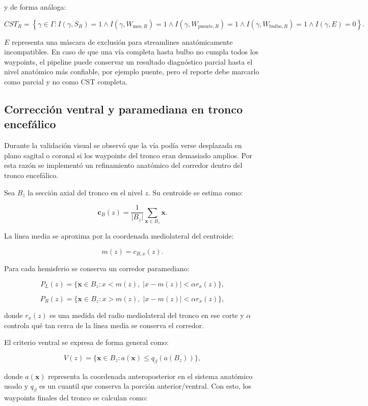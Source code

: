 \documentclass[12pt,a4paper]{article}
\begin{document}
y de forma análoga:

\[
CST_R=
\left\{
\gamma\in\Gamma:
I(\gamma,S_R)=1
\land
I(\gamma,W_{\text{mes},R})=1
\land
I(\gamma,W_{\text{puente},R})=1
\land
I(\gamma,W_{\text{bulbo},R})=1
\land
I(\gamma,E)=0
\right\}.
\]

$E$ representa una máscara de exclusión para streamlines anatómicamente incompatibles. En caso de que una vía completa hasta bulbo no cumpla todos los waypoints, el pipeline puede conservar un resultado diagnóstico parcial hasta el nivel anatómico más confiable, por ejemplo puente, pero el reporte debe marcarlo como parcial y no como CST completa.

\subsection{Corrección ventral y paramediana en tronco encefálico}

Durante la validación visual se observó que la vía podía verse desplazada en plano sagital o coronal si los waypoints del tronco eran demasiado amplios. Por esta razón se implementó un refinamiento anatómico del corredor dentro del tronco encefálico.

Sea $B_z$ la sección axial del tronco en el nivel $z$. Su centroide se estima como:

\[
\mathbf{c}_B(z)=
\frac{1}{|B_z|}
\sum_{\mathbf{x}\in B_z}
\mathbf{x}.
\]

La línea media se aproxima por la coordenada mediolateral del centroide:

\[
m(z)=c_{B,x}(z).
\]

Para cada hemisferio se conserva un corredor paramediano:

\[
P_L(z)=\{\mathbf{x}\in B_z: x<m(z),\; |x-m(z)|<\alpha r_x(z)\},
\]

\[
P_R(z)=\{\mathbf{x}\in B_z: x>m(z),\; |x-m(z)|<\alpha r_x(z)\},
\]

donde $r_x(z)$ es una medida del radio mediolateral del tronco en ese corte y $\alpha$ controla qué tan cerca de la línea media se conserva el corredor.

El criterio ventral se expresa de forma general como:

\[
V(z)=\{\mathbf{x}\in B_z: a(\mathbf{x})\leq q_{\beta}(a(B_z))\},
\]

donde $a(\mathbf{x})$ representa la coordenada anteroposterior en el sistema anatómico usado y $q_{\beta}$ es un cuantil que conserva la porción anterior/ventral. Con esto, los waypoints finales del tronco se calculan como:
\end{document}
